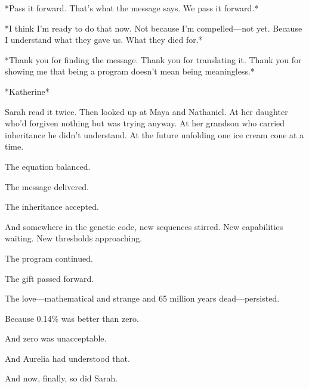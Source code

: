 *Pass it forward. That's what the message says. We pass it forward.*

*I think I'm ready to do that now. Not because I'm compelled—not yet. Because I understand what they gave us. What they died for.*

*Thank you for finding the message. Thank you for translating it. Thank you for showing me that being a program doesn't mean being meaningless.*

*Katherine*

Sarah read it twice. Then looked up at Maya and Nathaniel. At her daughter who'd forgiven nothing but was trying anyway. At her grandson who carried inheritance he didn't understand. At the future unfolding one ice cream cone at a time.

The equation balanced.

The message delivered.

The inheritance accepted.

And somewhere in the genetic code, new sequences stirred. New capabilities waiting. New thresholds approaching.

The program continued.

The gift passed forward.

The love—mathematical and strange and 65 million years dead—persisted.

Because 0.14\% was better than zero.

And zero was unacceptable.

And Aurelia had understood that.

And now, finally, so did Sarah.

